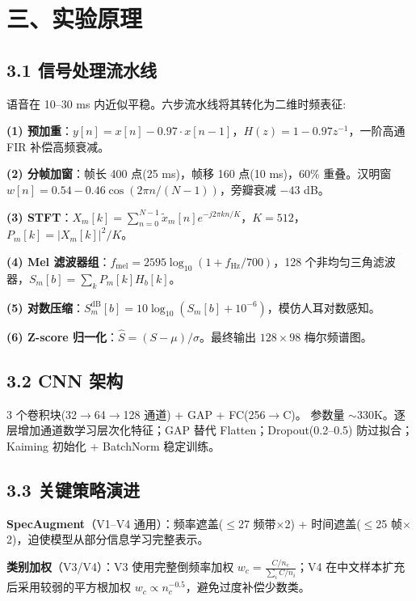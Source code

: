 ﻿\documentclass[12pt,a4paper]{article}
\begin{document}
\section*{三、实验原理}

\subsection*{3.1 信号处理流水线}

语音在 10--30 ms 内近似平稳。六步流水线将其转化为二维时频表征:

\textbf{(1) 预加重}：$y[n]=x[n]-0.97\cdot x[n-1]$，$H(z)=1-0.97z^{-1}$，一阶高通 FIR 补偿高频衰减。

\textbf{(2) 分帧加窗}：帧长 400 点(25 ms)，帧移 160 点(10 ms)，60\% 重叠。汉明窗 $w[n]=0.54-0.46\cos(2\pi n/(N-1))$，旁瓣衰减 $-43$ dB。

\textbf{(3) STFT}：$X_m[k]=\sum_{n=0}^{N-1}\tilde{x}_m[n]e^{-j2\pi kn/K}$，$K=512$，$P_m[k]=|X_m[k]|^2/K$。

\textbf{(4) Mel 滤波器组}：$f_{\text{mel}}=2595\log_{10}(1+f_{\text{Hz}}/700)$，128 个非均匀三角滤波器，$S_m[b]=\sum_k P_m[k]H_b[k]$。

\textbf{(5) 对数压缩}：$S_m^{\text{dB}}[b]=10\log_{10}(S_m[b]+10^{-6})$，模仿人耳对数感知。

\textbf{(6) Z-score 归一化}：$\hat{S}= (S-\mu)/\sigma$。最终输出 $128\times98$ 梅尔频谱图。

\subsection*{3.2 CNN 架构}

3 个卷积块(32$\to$64$\to$128 通道) + GAP + FC(256$\to$C)。
参数量 $\sim$330K。逐层增加通道数学习层次化特征；GAP 替代 Flatten；Dropout(0.2--0.5) 防过拟合；Kaiming 初始化 + BatchNorm 稳定训练。

\subsection*{3.3 关键策略演进}

\textbf{SpecAugment}（V1--V4 通用）：频率遮盖($\le$27 频带$\times$2) + 时间遮盖($\le$25 帧$\times$2)，迫使模型从部分信息学习完整表示。

\textbf{类别加权}（V3/V4）：V3 使用完整倒频率加权 $w_c=\frac{C/n_c}{\sum_i C/n_i}$；V4 在中文样本扩充后采用较弱的平方根加权 $w_c\propto n_c^{-0.5}$，避免过度补偿少数类。
\end{document}
